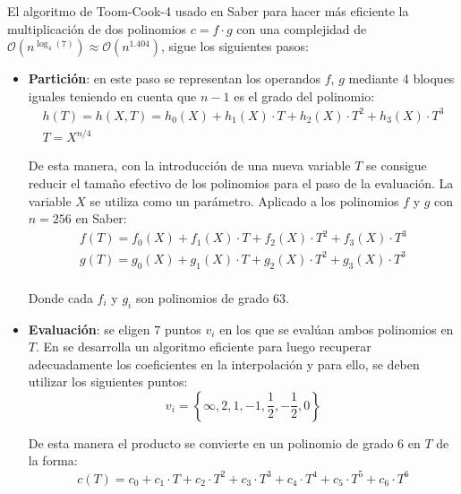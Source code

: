 El algoritmo de Toom-Cook-4 usado en Saber \cite{toomcook4} para hacer más eficiente la multiplicación de dos polinomios \(c=f\cdot g\) con una complejidad de \(\mathcal{O}(n^{\log_4(7)})\approx\mathcal{O}(n^{1.404})\), sigue los siguientes pasos:
\begin{itemize}
	\item \textbf{Partición}: en este paso se representan los operandos \(f\), \(g\) mediante 4 bloques iguales teniendo en cuenta que \(n-1\) es el grado del polinomio:
	\begin{equation}
		\begin{array}{l}
			h(T)=h(X,T)=h_0(X)+h_1(X)\cdot T+h_2(X)\cdot T^2+h_3(X)\cdot T^3\\
			T=X^{n/4}
		\end{array}
	\end{equation}
	
	De esta manera, con la introducción de una nueva variable \(T\) se consigue reducir el tamaño efectivo de los polinomios para el paso de la evaluación. La variable \(X\) se utiliza como un parámetro. Aplicado a los polinomios \(f\) y \(g\) con \(n=256\) en Saber:
	\begin{equation}
		\begin{array}{l}
		f(T)=f_0(X)+f_1(X)\cdot T+f_2(X)\cdot T^2+f_3(X)\cdot T^3\\
		g(T)=g_0(X)+g_1(X)\cdot T+g_2(X)\cdot T^2+g_3(X)\cdot T^3\\
		\end{array}
	\end{equation}
	
	Donde cada \(f_i\) y \(g_i\) son polinomios de grado \(63\).
	
	\item \textbf{Evaluación}: se eligen \(7\) puntos \(v_i\) en los que se evalúan ambos polinomios en \(T\). En \cite{toomcook4} se desarrolla un algoritmo eficiente para luego recuperar adecuadamente los coeficientes en la interpolación y para ello, se deben utilizar los siguientes puntos:
	\begin{equation}
		v_i=\left\{\infty, 2, 1, -1, \dfrac{1}{2}, -\dfrac{1}{2},0\right\}
	\end{equation}
	
	De esta manera el producto se convierte en un polinomio de grado \(6\) en \(T\) de la forma:
	\begin{equation}
		c(T)=c_0+c_1\cdot T+c_2\cdot T^2+c_3\cdot T^3+c_4\cdot T^4+c_5\cdot T^5+c_6\cdot T^6
	\end{equation}
	

\end{itemize}
